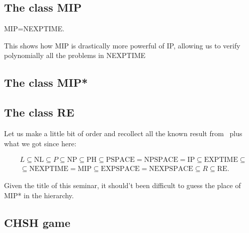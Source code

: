 \subsection{The class MIP}


\begin{theorem}
MIP=NEXPTIME.
\end{theorem}

This shows how MIP is drastically more powerful of IP, allowing us to verify polynomially all the problems in NEXPTIME


\subsection{The class MIP*}


\subsection{The class RE}


Let us make a little bit of order and recollect all the known result from~\cite{papadimitriou1994computational} plus what we got since here:

\begin{equation}
\begin{split}
    &L \subseteq \text{NL} \subseteq P \subseteq \text{NP} \subseteq \text{PH} \subseteq \text{PSPACE} = \text{NPSPACE} = \text{IP} \subseteq \text{EXPTIME} \subseteq  \\
    &\subseteq \text{NEXPTIME} = \text{MIP} \subseteq \text{EXPSPACE} = \text{NEXPSPACE} \subseteq R \subseteq \text{RE}.
\end{split}
\end{equation}

Given the title of this seminar, it should't been difficult to guess the place of MIP* in the hierarchy.

\subsection{CHSH game}
